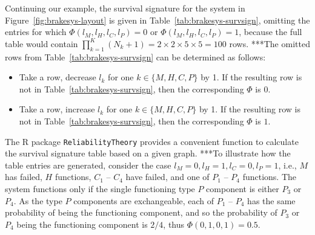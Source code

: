 \documentclass[authoryear]{elsarticle}
\begin{document}
Continuing our example,
the survival signature for the system in Figure~\ref{fig:brakesys-layout} is given in Table~\ref{tab:brakesys-survsign},
omitting the entries for which $\Phi(l_M, l_H, l_C, l_P) = 0$ or $\Phi(l_M, l_H, l_C, l_P) = 1$,
because the full table would contain $\prod_{k=1}^K (N_k + 1) = 2 \times 2 \times 5 \times 5 = 100$ rows.
***The omitted rows from Table~\ref{tab:brakesys-survsign} can be determined as follows:
\begin{itemize}
\item Take a row, decrease $l_k$ for one $k \in \{M, H, C, P\}$ by 1.
If the resulting row is not in Table~\ref{tab:brakesys-survsign}, then the corresponding $\Phi$ is $0$.
\item Take a row, increase $l_k$ for one $k \in \{M, H, C, P\}$ by 1.
If the resulting row is not in Table~\ref{tab:brakesys-survsign}, then the corresponding $\Phi$ is $1$.
\end{itemize} 
The \textsf{R} package \texttt{ReliabilityTheory} \citep{2016:aslett-RT}
provides a convenient function to calculate the survival signature table based on a given graph.
***To illustrate how the table entries are generated,
consider the case $l_M = 0, l_H = 1, l_C = 0, l_P = 1$,
i.e., $M$ has failed, $H$ functions, $C_1$ -- $C_4$ have failed, and one of $P_1$ -- $P_4$ functions.
The system functions only if the single functioning type $P$ component is either $P_3$ or $P_4$.
As the type $P$ components are exchangeable, each of $P_1$ -- $P_4$ has the same probability of being the functioning component,
and so the probability of $P_3$ or $P_4$ being the functioning component is $2 / 4$, thus $\Phi(0, 1, 0, 1) = 0.5$.
\end{document}
